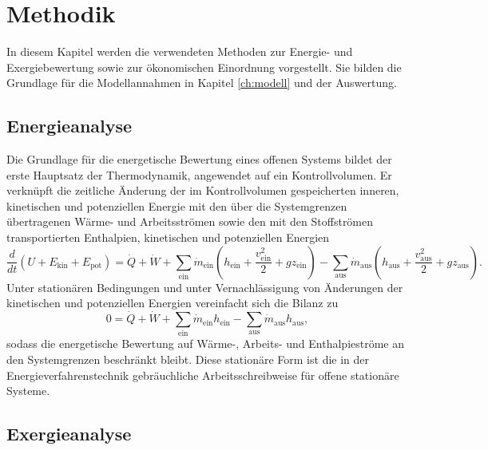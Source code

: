 \chapter{Methodik}
\label{ch:methodik_modellierung}

In diesem Kapitel werden die verwendeten Methoden zur Energie- und Exergiebewertung sowie zur ökonomischen Einordnung vorgestellt. Sie bilden die Grundlage für die Modellannahmen in Kapitel \ref{ch:modell} und der Auswertung.

\section{Energieanalyse}
\label{sec:energieanalyse}

Die Grundlage für die energetische Bewertung eines offenen Systems bildet der erste Hauptsatz der Thermodynamik, angewendet auf ein Kontrollvolumen. Er verknüpft die zeitliche Änderung der im Kontrollvolumen gespeicherten inneren, kinetischen und potenziellen Energie mit den über die Systemgrenzen übertragenen Wärme- und Arbeitsströmen sowie den mit den Stoffströmen transportierten Enthalpien, kinetischen und potenziellen Energien
\begin{equation}
\frac{d}{dt} \left( U + E_{\text{kin}} + E_{\text{pot}} \right)
= \dot{Q} + \dot{W}
+ \sum_{\text{ein}} \dot{m}_{\text{ein}} \left( h_{\text{ein}} + \frac{v_{\text{ein}}^2}{2} + g z_{\text{ein}} \right)
- \sum_{\text{aus}} \dot{m}_{\text{aus}} \left( h_{\text{aus}} + \frac{v_{\text{aus}}^2}{2} + g z_{\text{aus}} \right).
\end{equation}
Unter stationären Bedingungen und unter Vernachlässigung von Änderungen der kinetischen und potenziellen Energien vereinfacht sich die Bilanz zu
\begin{equation}
0 = \dot{Q} + \dot{W}
+ \sum_{\text{ein}} \dot{m}_{\text{ein}} h_{\text{ein}}
- \sum_{\text{aus}} \dot{m}_{\text{aus}} h_{\text{aus}},
\end{equation}
sodass die energetische Bewertung auf Wärme-, Arbeits- und Enthalpieströme an den Systemgrenzen beschränkt bleibt. Diese stationäre Form ist die in der Energieverfahrenstechnik gebräuchliche Arbeitsschreibweise für offene stationäre Systeme. \cite{baehrThermodynamik2016}

\section{Exergieanalyse}
\label{sec:exergieanalyse}

